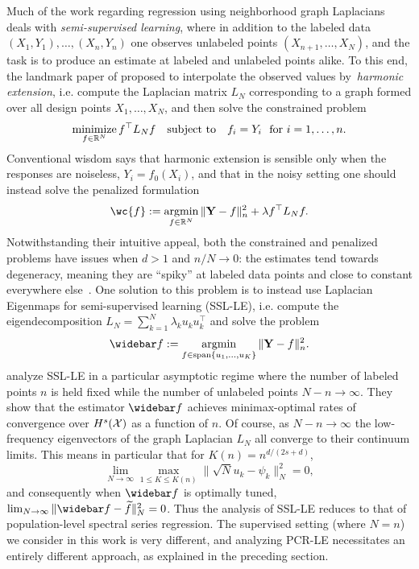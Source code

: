 Much of the work regarding regression using neighborhood graph Laplacians deals with \emph{semi-supervised learning}, where in addition to the labeled data $(X_1,Y_1),\ldots,(X_n,Y_n)$ one observes unlabeled points $(X_{n + 1},\ldots,X_{N})$, and the task is to produce an estimate at labeled and unlabeled points alike. To this end, the landmark paper of \cite{zhu2003semisupervised} proposed to interpolate the observed values by~\emph{harmonic extension}, i.e. compute the Laplacian matrix $L_N$  corresponding to a graph formed over all design points $X_1,\ldots,X_N$, and then solve the constrained problem
\begin{equation*}
\mathop{\mathrm{minimize}}_{f \in \mathbb{R}^N} f^{\top} L_N f \quad \mathrm{subject\,\,to}~~~ f_i = Y_i~~\textrm{for $i = 1,\ldots,n$.}
\end{equation*}
Conventional wisdom says that harmonic extension is sensible only when the responses are noiseless, $Y_i = f_0(X_i)$, and that in the noisy setting one should instead solve the penalized formulation
\begin{equation}
\label{eqn:graph_laplacian_regularization_ssl}
\wc{f} := \argmin_{f \in \Reals^N} \|{\bf Y} - f\|_n^2 + \lambda f^{\top} L_N f.
\end{equation}
Notwithstanding their intuitive appeal, both the constrained and penalized problems have issues when $d > 1$ and $n/N \to 0$: the estimates tend towards degeneracy, meaning they are ``spiky'' at labeled data points and close to constant everywhere else~\citep{nadler09,calder2019b, calder2020}. One solution to this problem is to instead use Laplacian Eigenmaps for semi-supervised learning (SSL-LE), i.e. compute the eigendecomposition $L_N = \sum_{k = 1}^{N} \lambda_k u_k u_k^{\top}$ and solve the problem
\begin{equation}
\label{eqn:laplacian_eigenmaps_ssl}
\wb{f} := \argmin_{f \in \mathrm{span}\{u_1,\ldots,u_K\}} \|{\bf Y} - f\|_n^2.
\end{equation}
\cite{zhou2011,lee2016} analyze SSL-LE in a particular asymptotic regime where the number of labeled points $n$ is held fixed while the number of unlabeled points $N - n \to \infty$. They show that the estimator $\wb{f}$ achieves minimax-optimal rates of convergence over $H^s(\mathcal{X})$ as a function of $n$. Of course, as $N - n \to \infty$ the low-frequency eigenvectors of the graph Laplacian $L_N$ all converge to their continuum limits. This means in particular that for $K(n) = n^{d/(2s + d)}$,
\begin{equation*}
\lim_{N \to \infty} \max_{1 \leq K \leq K(n)} \|\sqrt{N} u_k - \psi_k\|_N^2 = 0,
\end{equation*}
and consequently when $\wb{f}$ is optimally tuned, $\lim_{N \to \infty} \|\wb{f} - \wt{f}\|_N^2 = 0$. Thus the analysis of SSL-LE reduces to that of population-level spectral series regression. The supervised setting (where $N = n$) we consider in this work is very different, and analyzing PCR-LE necessitates an entirely different approach, as explained in the preceding section.

